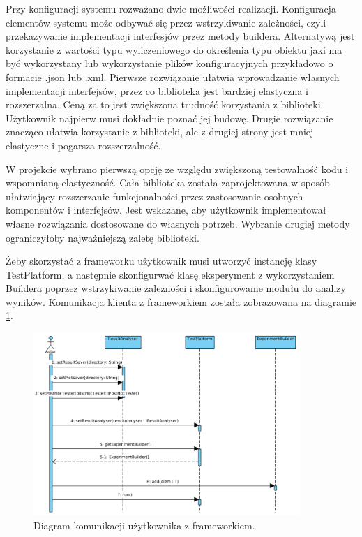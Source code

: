 \documentclass[12pt]{article}
\begin{document}
Przy konfiguracji systemu rozważano dwie możliwości realizacji. Konfiguracja elementów systemu może odbywać się przez wstrzykiwanie zależności, czyli przekazywanie implementacji interfesjów przez metody buildera. Alternatywą jest korzystanie z wartości typu wyliczeniowego do określenia typu obiektu jaki ma być wykorzystany lub wykorzystanie plików konfiguracyjnych przykładowo o formacie .json lub .xml. Pierwsze rozwiązanie ułatwia wprowadzanie własnych implementacji interfejsów, przez co biblioteka jest bardziej elastyczna i rozszerzalna. Ceną za to jest zwiększona trudność korzystania z biblioteki. Użytkownik najpierw musi dokładnie poznać jej budowę. Drugie rozwiązanie znacząco ułatwia korzystanie z biblioteki, ale z drugiej strony jest mniej elastyczne i pogarsza rozszerzalność. 

W projekcie wybrano pierwszą opcję ze względu zwiększoną testowalność kodu i wspomnianą elastyczność. Cała biblioteka została zaprojektowana w sposób ułatwiający rozszerzanie funkcjonalności przez zastosowanie osobnych komponentów i interfejsów. Jest wskazane, aby użytkownik implementował własne rozwiązania dostosowane do własnych potrzeb. Wybranie drugiej metody ograniczyłoby najważniejszą zaletę biblioteki.

Żeby skorzystać z frameworku użytkownik musi utworzyć instancję klasy TestPlatform, a następnie skonfigurwać klasę eksperyment z wykorzystaniem Buildera poprzez wstrzykiwanie zależności i skonfigurowanie modułu do analizy wyników. Komunikacja klienta z frameworkiem została zobrazowana na diagramie \ref{fig:sequenceUser}.

\begin{figure}
	\centering
	\includegraphics[width=0.9\textwidth]{img/sequenceUser.png}
	\caption{Diagram komunikacji użytkownika z frameworkiem.}
	\label{fig:sequenceUser}
\end{figure}
\end{document}
